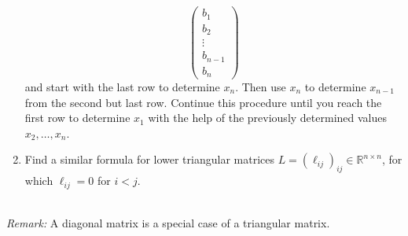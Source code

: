\begin{enumerate}
$$\begin{pmatrix}
	b_1 \\b_2\\\vdots\\ b_{n-1}\\b_n
	\end{pmatrix}$$
	and start with the last row to determine $x_n$. Then use $x_n$ to determine $x_{n-1}$ from the second but last row. Continue this procedure until you reach the first row to determine $x_1$ with the help of the previously determined values $x_2, \ldots, x_n$.
		\item Find a similar formula for lower triangular matrices $L = (\ell_{ij})_{ij} \in \mathbb{R}^{n \times n}$, for which $\ell_{ij} = 0$ for $i < j$.
\end{enumerate}
~\\
\textit{Remark:} A diagonal matrix is a special case of a triangular matrix.